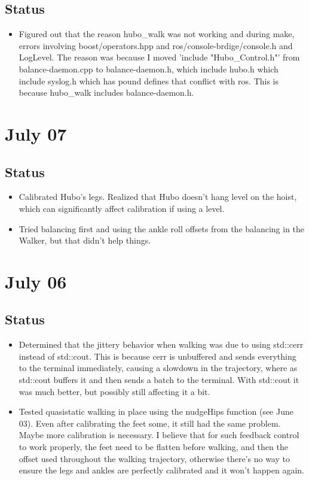 \documentclass[letterpaper, 10 pt]{report}
\begin{document}
\subsection*{Status}
\begin{itemize}
\item Figured out that the reason hubo\_walk was not working and during make, errors involving boost/operators.hpp and ros/console-brdige/console.h and LogLevel. The reason was because I moved 'include "Hubo\_Control.h"' from balance-daemon.cpp to balance-daemon.h, which include hubo.h which include syslog.h which has pound defines that conflict with ros. This is because hubo\_walk includes balance-daemon.h.
\end{itemize}

\section*{July 07}
\subsection*{Status}
\begin{itemize}
\item Calibrated Hubo's legs. Realized that Hubo doesn't hang level on the hoist, which can significantly affect calibration if using a level.
\item Tried balancing first and using the ankle roll offsets from the balancing in the Walker, but that didn't help things.
\end{itemize}

\section*{July 06}
\subsection*{Status}
\begin{itemize}
\item Determined that the jittery behavior when walking was due to using std::cerr instead of std::cout. This is because cerr is unbuffered and sends everything to the terminal immediately, causing a slowdown in the trajectory, where as std::cout buffers it and then sends a batch to the terminal. With std::cout it was much better, but possibly still affecting it a bit.
\item Tested quasistatic walking in place using the nudgeHips function (see June 03). Even after calibrating the feet some, it still had the same problem. Maybe more calibration is necessary. I believe that for such feedback control to work properly, the feet need to be flatten before walking, and then the offset used throughout the walking trajectory, otherwise there's no way to ensure the legs and ankles are perfectly calibrated and it won't happen again.
\end{itemize}
\end{document}
